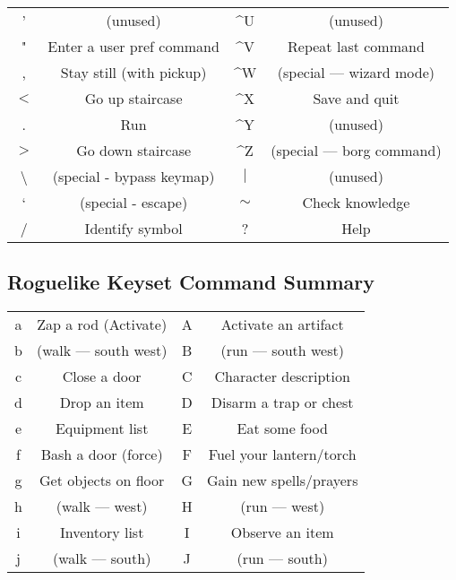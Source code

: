 \begin{tabular}{cc|cc}
' & (unused) & \^{}U & (unused)\\
" & Enter a user pref command & \^{}V & Repeat last command\\
, & Stay still (with pickup) & \^{}W & (special --- wizard mode)\\
$<$ & Go up staircase & \^{}X & Save and quit\\
. & Run & \^{}Y & (unused)\\
$>$ & Go down staircase & \^{}Z & (special --- borg command)\\
\textbackslash & (special - bypass keymap) & $|$ & (unused)\\
` & (special - escape) & $\sim$ & Check knowledge\\
/ & Identify symbol & ? & Help\\
\end{tabular}

\subsection{Roguelike Keyset Command Summary}
\begin{tabular}{cc|cc}
a & Zap a rod (Activate) & A & Activate an artifact\\
b & (walk --- south west) & B & (run --- south west)\\
c & Close a door & C & Character description\\
d & Drop an item & D & Disarm a trap or chest\\
e & Equipment list & E & Eat some food\\
f & Bash a door (force) & F & Fuel your lantern/torch\\
g & Get objects on floor & G & Gain new spells/prayers\\
h & (walk --- west) & H & (run --- west)\\
i & Inventory list & I & Observe an item\\
j & (walk --- south) & J & (run --- south)\\
\end{tabular}

